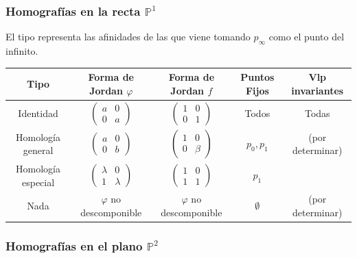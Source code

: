 \documentclass[leqno]{article}
\begin{document}
\subsubsection{Homografías en la recta $\mathbb{P}^1$}
El tipo representa las afinidades de las que viene tomando $p_\infty$ como el punto del infinito.
\begin{center}
  \begin{tabular}{|c|c|c|c|c|}
	\hline
    Tipo & Forma de Jordan $\varphi $ & Forma de Jordan $f$ & Puntos Fijos & Vlp invariantes \\
	\hline
	Identidad  & $\begin{pmatrix} a & 0 \\ 0 & a \end{pmatrix} $ & $\begin{pmatrix} 1 & 0 \\ 0 & 1 \end{pmatrix} $ & Todos & Todas \\
	\hline
	Homología general & $\begin{pmatrix} a & 0 \\ 0 & b \end{pmatrix} $ & $\begin{pmatrix} 1 & 0 \\ 0 & \beta \end{pmatrix} $ & $p_0, p_1$ & (por determinar) \\
	\hline
	Homología especial & $\begin{pmatrix} \lambda & 0 \\ 1 & \lambda \end{pmatrix} $ & $\begin{pmatrix} 1 & 0 \\ 1 & 1 \end{pmatrix} $ & $p_1$ & \\
	\hline
	Nada & $\varphi$ no descomponible & $\varphi $ no descomponible & $\emptyset$ & (por determinar) \\
	\hline
  \end{tabular}
\end{center}

\subsubsection{Homografías en el plano $\mathbb{P}^2$}
\end{document}
